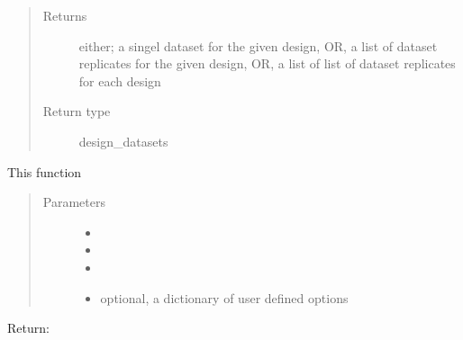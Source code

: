 \documentclass[letterpaper,10pt,english,openany,oneside]{sphinxmanual}
\begin{document}
\begin{fulllineitems}
\begin{fulllineitems}
\begin{quote}
\begin{description}
\begin{itemize}
\end{itemize}

\item[{Returns}] \leavevmode
either; a singel dataset for the given design,  OR,  a list of dataset replicates for the given design,  OR,  a list of list of dataset replicates for each design

\item[{Return type}] \leavevmode
design\_datasets

\end{description}\end{quote}

\end{fulllineitems}


\begin{fulllineitems}
\label{\detokenize{nloed:nloed.model.Model.predict}}
This function
\begin{quote}\begin{description}
\item[{Parameters}] \leavevmode\begin{itemize}
\item {} 
 \textendash{} 

\item {} 
 \textendash{} 

\item {} 
 \textendash{} 

\item {} 
 \textendash{} optional,  a dictionary of user defined options

\end{itemize}

\end{description}\end{quote}

Return:

\end{fulllineitems}


\end{fulllineitems}
\end{document}
